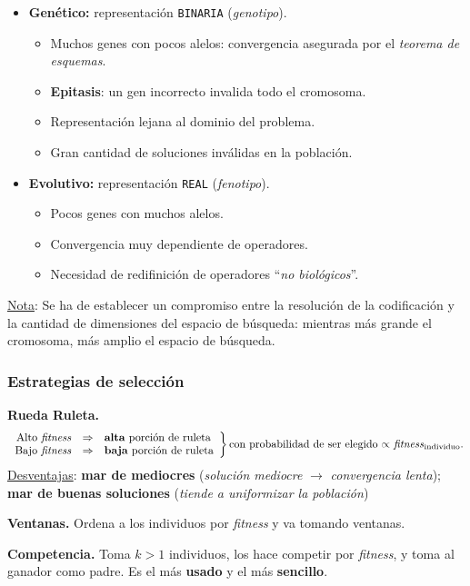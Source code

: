 \documentclass[10pt,a4paper]{article}
\begin{document}
\begin{itemize}
\item \textbf{Genético:} representación \texttt{BINARIA} (\textit{genotipo}).
\begin{itemize}
\item Muchos genes con pocos alelos: convergencia asegurada por el \textit{teorema de esquemas}.
\item \textbf{Epitasis}: un gen incorrecto invalida todo el cromosoma.
\item Representación lejana al dominio del problema.
\item Gran cantidad de soluciones inválidas en la población.
\end{itemize}
\item \textbf{Evolutivo:} representación \texttt{REAL} (\textit{fenotipo}).
\begin{itemize}
\item Pocos genes con muchos alelos.
\item Convergencia muy dependiente de operadores.
\item Necesidad de redifinición de operadores ``\textit{no biológicos}''.
\end{itemize}
\end{itemize}

\underline{Nota}: Se ha de establecer un compromiso entre la resolución de la codificación y la cantidad de dimensiones del espacio de búsqueda: mientras más grande el cromosoma, más amplio el espacio de búsqueda.

\subsubsection{Estrategias de selección}

\begin{description}
\item \textbf{Rueda Ruleta.} 
\[
\left.
\begin{array}{rcl}
\text{Alto \textit{fitness}} & \Rightarrow & \text{\textbf{alta} porción de ruleta} \\
\text{Bajo \textit{fitness}} & \Rightarrow & \text{\textbf{baja} porción de ruleta}
\end{array}
\right\}
\text{con probabilidad de ser elegido $\propto$ \textit{fitness}$_{\text{individuo}}$.}
\]
\underline{Desventajas}: \textbf{mar de mediocres} (\textit{solución mediocre} $\rightarrow$ \textit{convergencia lenta}); \textbf{mar de buenas soluciones} (\textit{tiende a uniformizar la población})
\item \textbf{Ventanas.} Ordena a los individuos por \textit{fitness} y va tomando ventanas.
\item \textbf{Competencia.} Toma $k>1$ individuos, los hace competir por \textit{fitness}, y toma al ganador como padre. Es el más \textbf{usado} y el más \textbf{sencillo}.
\end{description}
\end{document}
